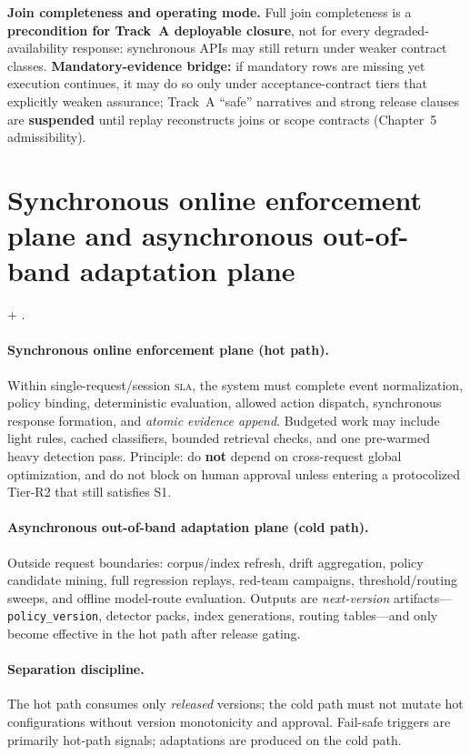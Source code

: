 \documentclass[11pt,a4paper]{report}
\begin{document}
\noindent\textbf{Join completeness and operating mode.} Full join completeness is a \textbf{precondition for Track~A deployable closure}, not for every degraded-availability response: synchronous APIs may still return under weaker contract classes. \textbf{Mandatory-evidence bridge:} if mandatory rows are missing yet execution continues, it may do so only under acceptance-contract tiers that explicitly weaken assurance; Track~A ``safe'' narratives and strong release clauses are \textbf{suspended} until replay reconstructs joins or scope contracts (Chapter~5 admissibility).

\section{Synchronous online enforcement plane and asynchronous out-of-band adaptation plane}
\ControlPlane{} + \DecoupledSafety{}.

\paragraph{Synchronous online enforcement plane (hot path).} Within single-request/session \textsc{sla}, the system must complete event normalization, policy binding, deterministic evaluation, allowed action dispatch, synchronous response formation, and \emph{atomic evidence append}. Budgeted work may include light rules, cached classifiers, bounded retrieval checks, and one pre-warmed heavy detection pass. Principle: do \textbf{not} depend on cross-request global optimization, and do not block on human approval unless entering a protocolized Tier-R2 that still satisfies S1.

\paragraph{Asynchronous out-of-band adaptation plane (cold path).} Outside request boundaries: corpus/index refresh, drift aggregation, policy candidate mining, full regression replays, red-team campaigns, threshold/routing sweeps, and offline model-route evaluation. Outputs are \emph{next-version} artifacts—\texttt{policy\_version}, detector packs, index generations, routing tables—and only become effective in the hot path after release gating.

\paragraph{Separation discipline.} The hot path consumes only \emph{released} versions; the cold path must not mutate hot configurations without version monotonicity and approval. Fail-safe triggers are primarily hot-path signals; adaptations are produced on the cold path.
\end{document}
